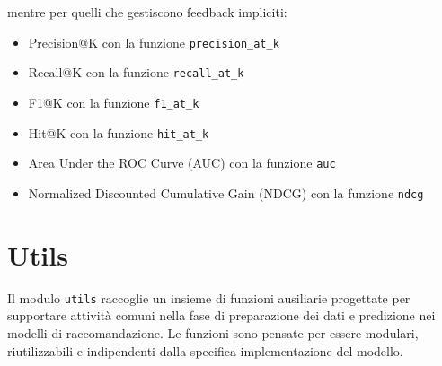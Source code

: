mentre per quelli che gestiscono feedback impliciti:

\begin{itemize}
    \item Precision@K con la funzione \texttt{precision\_at\_k}
    \item Recall@K con la funzione \texttt{recall\_at\_k}
    \item F1@K con la funzione \texttt{f1\_at\_k}
    \item Hit@K con la funzione \texttt{hit\_at\_k}
    \item Area Under the ROC Curve (AUC) con la funzione \texttt{auc}
    \item Normalized Discounted Cumulative Gain (NDCG) con la funzione \texttt{ndcg}
\end{itemize}

\section{Utils}

Il modulo \texttt{utils} raccoglie un insieme di funzioni ausiliarie progettate per supportare attività comuni nella fase di preparazione dei dati e predizione nei modelli di raccomandazione. Le funzioni sono pensate per essere modulari, riutilizzabili e indipendenti dalla specifica implementazione del modello.

